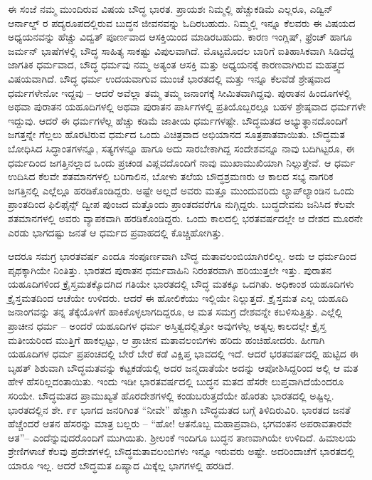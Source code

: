 ಈ ಸಂಜೆ ನಮ್ಮ ಮುಂದಿರುವ ವಿಷಯ ಬೌದ್ಧ ಭಾರತ. ಪ್ರಾಯಶಃ ನಿಮ್ಮಲ್ಲಿ ಹೆಚ್ಚುಕಡಿಮೆ ಎಲ್ಲರೂ, ಎಡ್ವಿನ್ ಆರ್ನಾಲ್ಡ್ ರ ಪದ್ಯರೂಪದಲ್ಲಿರುವ ಬುದ್ಧನ ಜೀವನವನ್ನು ಓದಿರಬಹುದು. ನಿಮ್ಮಲ್ಲಿ ಇನ್ನೂ ಕೆಲವರು ಈ ವಿಷಯದ ಅಧ್ಯಯನವನ್ನು ಹೆಚ್ಚು ವಿದ್ವತ್ ಪೂರ್ಣವಾದ ಆಸಕ್ತಿಯಿಂದ ಮಾಡಿರಬಹುದು. ಕಾರಣ ಇಂಗ್ಲಿಷ್, ಫ್ರೆಂಚ್ ಹಾಗೂ ಜರ್ಮನ್ ಭಾಷೆಗಳಲ್ಲಿ ಬೌದ್ಧ ಸಾಹಿತ್ಯ ಸಾಕಷ್ಟು ವಿಪುಲವಾಗಿದೆ. ಮೊಟ್ಟಮೊದಲ ಬಾರಿಗೆ ಐತಿಹಾಸಿಕವಾಗಿ ಸಿಡಿದೆದ್ದ ಜಾಗತಿಕ ಧರ್ಮವಾದ, ಬೌದ್ಧ ಧರ್ಮವು ನಮ್ಮ ಅತ್ಯಂತ ಆಸಕ್ತಿ ಮತ್ತು ಅಧ್ಯಯನಕ್ಕೆ ಕಾರಣವಾಗಿರುವ ಮಹತ್ತ್ವದ ವಿಷಯವಾಗಿದೆ. ಬೌದ್ಧ ಧರ್ಮ ಉದಯವಾಗುವ ಮುಂಚೆ ಭಾರತದಲ್ಲಿ ಮತ್ತು ಇನ್ನೂ ಕೆಲವೆಡೆ ಶ್ರೇಷ್ಠವಾದ ಧರ್ಮಗಳೇನೋ ಇದ್ದವು – ಆದರೆ ಅವೆಲ್ಲಾ ತಮ್ಮ ತಮ್ಮ ಜನಾಂಗಕ್ಕೆ ಸೀಮಿತವಾಗಿದ್ದವು. ಪುರಾತನ ಹಿಂದೂಗಳಲ್ಲಿ ಅಥವಾ ಪುರಾತನ ಯಹೂದಿಗಳಲ್ಲಿ ಅಥವಾ ಪುರಾತನ ಪಾರ್ಸಿಗಳಲ್ಲಿ ಪ್ರತಿಯೊಬ್ಬರಲ್ಲೂ ಬಹಳ ಶ್ರೇಷ್ಠವಾದ ಧರ್ಮಗಳೇ ಇದ್ದುವು. ಆದರೆ ಈ ಧರ್ಮಗಳೆಲ್ಲ ಹೆಚ್ಚು ಕಡಿಮೆ ಜಾತೀಯ ಧರ್ಮಗಳಷ್ಟೇ. ಬೌದ್ಧಮತದ ಅಭ್ಯುತ್ಥಾನದೊಂದಿಗೆ ಜಗತ್ತನ್ನೇ ಗೆಲ್ಲಲು ಹೊರಟಿರುವ ಧರ್ಮದ ಒಂದು ವಿಚಿತ್ರವಾದ ಅಭಿಯಾನದ ಸೂತ್ರಪಾತವಾಯಿತು. ಬೌದ್ಧಮತ ಬೋಧಿಸಿದ ಸಿದ್ಧಾಂತಗಳನ್ನೂ, ಸತ್ಯಗಳನ್ನೂ ಹಾಗೂ ಅದು ಸಾರಬೇಕಾಗಿದ್ದ ಸಂದೇಶವನ್ನೂ ನಾವು ಬದಿಗಿಟ್ಟರೂ, ಈ ಧರ್ಮದಿಂದ ಜಗತ್ತಿನಲ್ಲಾದ ಒಂದು ಪ್ರಚಂಡ ವಿಪ್ಲವದೊಂದಿಗೆ ನಾವು ಮುಖಾಮುಖಿಯಾಗಿ ನಿಲ್ಲುತ್ತೇವೆ. ಆ ಧರ್ಮ ಉದಿಸಿದ ಕೆಲವೇ ಶತಮಾನಗಳಲ್ಲಿ ಬರಿಗಾಲಿನ, ಬೋಳು ತಲೆಯ ಬೌದ್ಧಶ್ರಮಣರು ಆ ಕಾಲದ ಸಭ್ಯ ನಾಗರಿಕ ಜಗತ್ತಿನಲ್ಲಿ ಎಲ್ಲೆಲ್ಲೂ ಹರಡಿಕೊಂಡಿದ್ದರು. ಅಷ್ಟೇ ಅಲ್ಲದೆ ಅವರು ಮತ್ತೂ ಮುಂದುವರಿದು ಲ್ಯಾಪ್‌ಲ್ಯಾಂಡಿನ ಒಂದು ಪ್ರಾಂತದಿಂದ ಫಿಲಿಫೈನ್ಸ್ ದ್ವೀಪ ಪುಂಜದ ಮತ್ತೊಂದು ಪ್ರಾಂತದವರೆಗೂ ನುಗ್ಗಿದ್ದರು. ಬುದ್ಧದೇವನು ಜನಿಸಿದ ಕೆಲವೇ ಶತಮಾನಗಳಲ್ಲಿ ಅವರು ವ್ಯಾಪಕವಾಗಿ ಹರಡಿಕೊಂಡಿದ್ದರು. ಒಂದು ಕಾಲದಲ್ಲಿ ಭರತವರ್ಷದಲ್ಲೇ ಆ ದೇಶದ ಮೂರನೇ ಎರಡು ಭಾಗದಷ್ಟು ಜನತೆ ಆ ಧರ್ಮದ ಪ್ರವಾಹದಲ್ಲಿ ಕೊಚ್ಚಿಹೋಗಿತ್ತು.

ಆದರೂ ಸಮಗ್ರ ಭಾರತವರ್ಷ ಎಂದೂ ಸಂಪೂರ್ಣವಾಗಿ ಬೌದ್ಧ ಮತಾವಲಂಬಿಯಾಗಿರಲಿಲ್ಲ. ಅದು ಆ ಧರ್ಮದಿಂದ ಪೃಥಕ್ಕಾಗಿಯೇ ನಿಂತಿತ್ತು. ಭಾರತದ ಪುರಾತನ ಧರ್ಮವಾಹಿನಿ ನಿರಂತರವಾಗಿ ಹರಿಯುತ್ತಲೇ ಇತ್ತು. ಪುರಾತನ ಯಹೂದಿಗಳಿಂದ ಕ್ರೈಸ್ತಮತಕ್ಕೊದಗಿದ ಗತಿಯೇ ಭಾರತದಲ್ಲಿ ಬೌದ್ಧ ಮತಕ್ಕೂ ಒದಗಿತು. ಅಧಿಕಾಂಶ ಯಹೂದಿಗಳು ಕ್ರೈಸ್ತಮತದಿಂದ ಆಚೆಯೇ ಉಳಿದರು. ಆದರೆ ಈ ಹೋಲಿಕೆಯು ಇಲ್ಲಿಯೇ ನಿಲ್ಲುತ್ತದೆ. ಕ್ರೈಸ್ತಮತ ಎಲ್ಲ ಯಹೂದಿ ಜನಾಂಗವನ್ನು ತನ್ನ ತೆಕ್ಕೆಯೊಳಗೆ ಹಾಕಿಕೊಳ್ಳಲಾಗದಿದ್ದರೂ, ಆ ಮತ ಸಮಗ್ರ ದೇಶವನ್ನೇ ಕಬಳಿಸುತ್ತಿತ್ತು. ಎಲ್ಲೆಲ್ಲಿ ಪ್ರಾಚೀನ ಧರ್ಮ – ಅಂದರೆ ಯಹೂದಿಗಳ ಧರ್ಮ ಅಸ್ತಿತ್ವದಲ್ಲಿತ್ತೋ ಅವುಗಳೆಲ್ಲ ಅತ್ಯಲ್ಪ ಕಾಲದಲ್ಲೇ ಕ್ರೈಸ್ತ ಮತೀಯರಿಂದ ಮುತ್ತಿಗೆ ಹಾಕಲ್ಪಟ್ಟು, ಆ ಪ್ರಾಚೀನ ಮತಾವಲಂಬಿಗಳು ಹರಿದು ಹಂಚಿಹೋದರು. ಹೀಗಾಗಿ ಯಹೂದಿಗಳ ಧರ್ಮ ಪ್ರಪಂಚದಲ್ಲಿ ಬೇರೆ ಬೇರೆ ಕಡೆ ವಿಕ್ಷಿಪ್ತ ಭಾವದಲ್ಲಿ ಇದೆ. ಆದರೆ ಭರತವರ್ಷದಲ್ಲಿ ಹುಟ್ಟಿದ ಈ ಬೃಹತ್ ಶಿಶುವಾಗಿ ಬೌದ್ಧಮತವನ್ನು ಕಟ್ಟಕಡೆಯಲ್ಲಿ ಅದರ ಜನ್ಮದಾತೆಯೇ ಅದನ್ನು ಆಪೋಶಿಸಿದ್ದರಿಂದ ಅಲ್ಲಿ ಆ ಮತ ಹೇಳ ಹೆಸರಿಲ್ಲದಂತಾಯಿತು. ಇಂದು ಇಡೀ ಭಾರತವರ್ಷದಲ್ಲಿ ಬುದ್ಧನ ಮತದ ಹೆಸರೇ ಲುಪ್ತವಾಗಿದೆಯೆಂದರೂ ಸರಿಯೇ. ಬೌದ್ಧಮತದ ಪ್ರಾಮುಖ್ಯತೆ ಹೊರದೇಶಗಳಲ್ಲಿ ಕಂಡುಬರುತ್ತದೆಯೇ ಹೊರತು ಭಾರತದಲ್ಲಿ ಅಷ್ಟಿಲ್ಲ. ಭಾರತದಲ್ಲಿನ ಶೇ. ೯೯ ಭಾಗದ ಜನರಿಗಿಂತ “ನೀವೇ” ಹೆಚ್ಚಾಗಿ ಬೌದ್ಧಮತದ ಬಗ್ಗೆ ತಿಳಿದಿರುವಿರಿ. ಭಾರತದ ಜನತೆ ಹೆಚ್ಚೆಂದರೆ ಆತನ ಹೆಸರನ್ನು ಮಾತ್ರ ಬಲ್ಲರು – “ಹೋ! ಆತನೊಬ್ಬ ಮಹಾಪ್ರವಾದಿ, ಭಗವಂತನ ಅಪರಾವತಾರವೇ ಆತ”– ಎಂದೆನ್ನುವುದರೊಂದಿಗೆ ಮುಗಿಯಿತು. ಶ‍್ರೀಲಂಕೆ ಇಂದಿಗೂ ಬುದ್ಧನ ತಾಣವಾಗಿಯೇ ಉಳಿದಿದೆ. ಹಿಮಾಲಯ ಶ್ರೇಣಿಗಳಾಚೆ ಕೆಲವು ಪ್ರದೇಶಗಳಲ್ಲಿ ಬೌದ್ಧಮತಾವಲಂಬಿಗಳು ಇನ್ನೂ ಇರುವರು ಅಷ್ಟೇ. ಅದರಿಂದಾಚೆಗೆ ಭಾರತದಲ್ಲಿ ಯಾರೂ ಇಲ್ಲ. ಆದರೆ ಬೌದ್ಧಮತ ಏಷ್ಯಾದ ಮಿಕ್ಕೆಲ್ಲ ಭಾಗಗಳಲ್ಲಿ ಹರಡಿದೆ.

